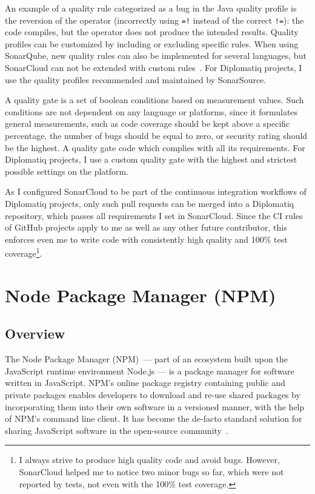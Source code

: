 An example of a quality rule categorized as a bug in the Java quality profile is the reversion of the  operator (incorrectly using \lstinline{=!} instead of the correct \lstinline{!=}): the code compiles, but the operator does not produce the intended results. Quality profiles can be customized by including or excluding specific rules. When using SonarQube, new quality rules can also be implemented for several languages, but SonarCloud can not be extended with custom rules~\cite{sonar-custom-rules}. For Diplomatiq projects, I use the quality profiles recommended and maintained by SonarSource.

A quality gate is a set of boolean conditions based on measurement values. Such conditions are not dependent on any language or platforms, since it formulates general measurements, such as code coverage should be kept above a specific percentage, the number of bugs should be equal to zero, or security rating should be the highest. A quality gate  code which complies with all its requirements. For Diplomatiq projects, I use a custom quality gate with the highest and strictest possible settings on the platform.

As I configured SonarCloud to be part of the continuous integration workflows of Diplomatiq projects, only such pull requests can be merged into a Diplomatiq repository, which passes all requirements I set in SonarCloud. Since the CI rules of GitHub projects apply to me as well as any other future contributor, this enforces even me to write code with consistently high quality and 100\% test coverage\footnote{I always strive to produce high quality code and avoid bugs. However, SonarCloud helped me to notice two minor bugs so far, which were not reported by tests, not even with the 100\% test coverage.}.

\section{Node Package Manager (NPM)}

\subsection{Overview}

The Node Package Manager (NPM) — part of an ecosystem built upon the JavaScript runtime environment Node.js — is a package manager for software written in JavaScript. NPM's online package registry containing public and private packages enables developers to download and re-use shared packages by incorporating them into their own software in a versioned manner, with the help of NPM's command line client. It has become the de-facto standard solution for sharing JavaScript software in the open-source community~\cite{herron2016node}.


